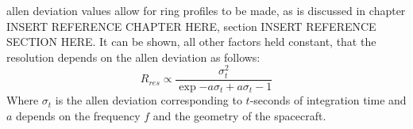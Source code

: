 \documentclass{article}
\begin{document}
                \gls{allen deviation} values allow for
                 ring
                profiles to be made, as is discussed in
                chapter INSERT REFERENCE CHAPTER HERE,
                section INSERT REFERENCE SECTION HERE.
                It can be shown, all other factors held
                constant, that the resolution depends on the
                \gls{allen deviation} as follows:
                \begin{equation}
                    R_{res}\propto
                    \frac{\sigma_{t}^{2}}
                         {\exp{-a\sigma_{t}}+a\sigma_{t}-1}
                \end{equation}
                Where $\sigma_{t}$ is the \gls{allen deviation}
                corresponding to $t$-seconds of integration
                time and $a$ depends on the frequency $f$ and
                the geometry of the spacecraft.
\end{document}
